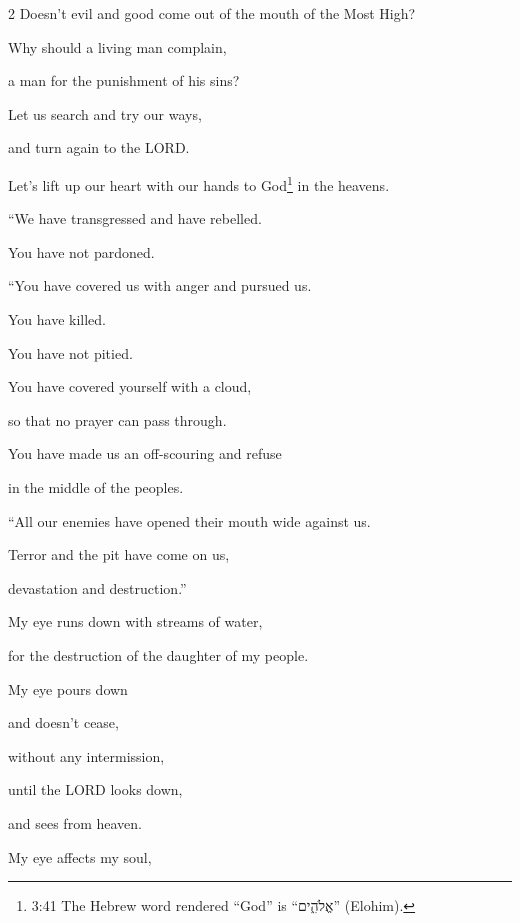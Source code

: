 \begin{multicols}{2}
	\myverse{}Doesn’t evil and good come out of the mouth of the Most High?
	
	\myverse{}Why should a living man complain,
	
	a man for the punishment of his sins?

	\vspace{\baselineskip}
	
	\myverse{}Let us search and try our ways,
	
	and turn again to the LORD.
	
	\myverse{}Let’s lift up our heart with our hands to God\footnote{3:41 The Hebrew word rendered “God” is “אֱלֹהִ֑ים” (Elohim).} in the heavens.
	
	\myverse{}“We have transgressed and have rebelled.
	
	You have not pardoned.

	\vspace{\baselineskip}
	
	\myverse{}“You have covered us with anger and pursued us.
	
	You have killed.
	
	You have not pitied.
	
	\myverse{}You have covered yourself with a cloud,
	
	so that no prayer can pass through.
	
	\myverse{}You have made us an off-scouring and refuse
	
	in the middle of the peoples.

	\vspace{\baselineskip}
	
	\myverse{}“All our enemies have opened their mouth wide against us.
	
	\myverse{}Terror and the pit have come on us,
	
	devastation and destruction.”

	\vspace{\baselineskip}
	
	\myverse{}My eye runs down with streams of water,
	
	for the destruction of the daughter of my people.
	
	\myverse{}My eye pours down
	
	and doesn’t cease,
	
	without any intermission,
	
	\myverse{}until the LORD looks down,
	
	and sees from heaven.
	
	\myverse{}My eye affects my soul,
	

\end{multicols}
